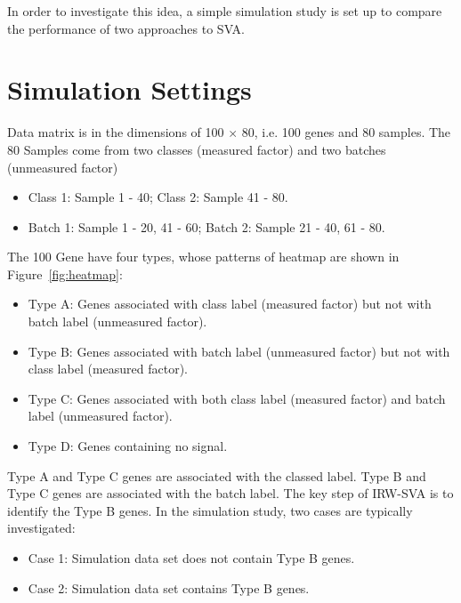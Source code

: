 \documentclass[11pt]{article}
\begin{document}
In order to investigate this idea, a simple simulation study is set up to compare the performance of two approaches to SVA.

\section{Simulation Settings} 

Data matrix is in the dimensions of 100 $\times$ 80, i.e. 100 genes and 80 samples. The 80 Samples come from two classes (measured factor) and two batches (unmeasured factor)
\begin{itemize} 
\item Class 1: Sample 1 - 40; Class 2: Sample 41 - 80.
\item Batch 1: Sample 1 - 20, 41 - 60; Batch 2: Sample 21 - 40, 61 - 80.
\end{itemize}
The 100 Gene have four types, whose patterns of heatmap are shown in Figure~\ref{fig:heatmap}:
\begin{itemize}
\item Type A: Genes associated with class label (measured factor) but not with batch label (unmeasured factor).
\item Type B: Genes associated with batch label (unmeasured factor) but not with class label (measured factor).
\item Type C: Genes associated with both class label (measured factor) and batch label (unmeasured factor).
\item Type D: Genes containing no signal.
\end{itemize}
Type A and Type C genes are associated with the classed label. Type B and Type C genes are associated with the batch label. The key step of IRW-SVA is to identify the Type B genes. In the simulation study, two cases are typically investigated:
\begin{itemize}
\item Case 1: Simulation data set does not contain Type B genes.
\item Case 2: Simulation data set contains Type B genes.
\end{itemize}
\end{document}
